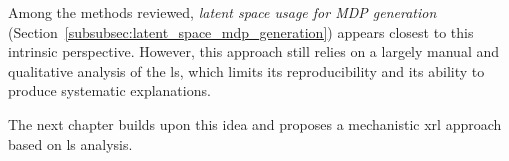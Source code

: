 Among the methods reviewed, \textit{latent space usage for MDP generation} (Section~\ref{subsubsec:latent_space_mdp_generation}) appears closest to this intrinsic perspective.
However, this approach still relies on a largely manual and qualitative analysis of the \gls{ls}, which limits its reproducibility and its ability to produce systematic explanations.

The next chapter builds upon this idea and proposes a mechanistic \gls{xrl} approach based on \gls{ls} analysis.
